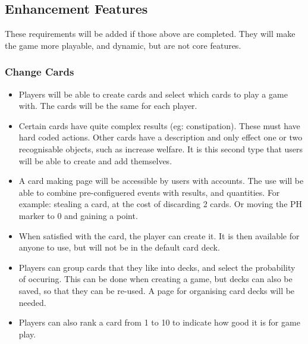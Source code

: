 \subsection{Enhancement Features}
These requirements will be added if those above are completed. They will make the game more playable, and dynamic, but are not core features.
	\subsubsection{Change Cards}
	  \begin{itemize}
	  	\item Players will be able to create cards and select which cards to play a game with. The cards will be the same for each player.
	  	\item Certain cards have quite complex results (eg: constipation). These must have hard coded actions. Other cards have a description and only effect one or two recognisable objects, such as increase welfare. It is this second type that users will be able to create and add themselves.
	  	\item A card making page will be accessible by users with accounts. The use will be able to combine pre-configuered events with results, and quantities. For example: stealing a card, at the cost of discarding 2 cards. Or moving the PH marker to 0 and gaining a point.
	  	\item When satisfied with the card, the player can create it. It is then available for anyone to use, but will not be in the default card deck.
	  	\item Players can group cards that they like into decks, and select the probability of occuring. This can be done when creating a game, but decks can also be saved, so that they can be re-used. A page for organising card decks will be needed.
	  	\item Players can also rank a card from 1 to 10 to indicate how good it is for game play.
	  \end{itemize}
